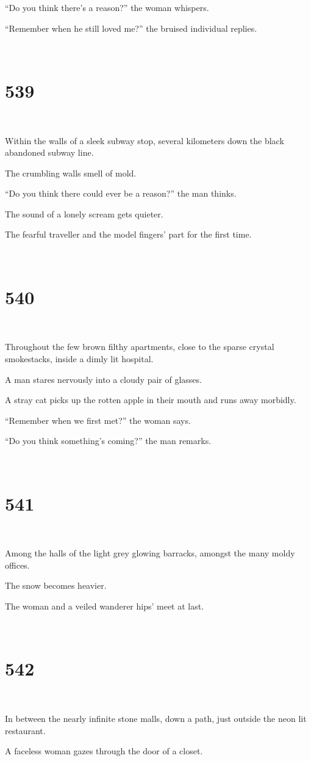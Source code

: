 \documentclass{report}
\begin{document}
``Do you think there's a reason?'' the woman whispers.

``Remember when he still loved me?'' the bruised individual replies.

~
\chapter*{539}
~

Within the walls of a sleek subway stop, several kilometers down the black abandoned subway line.

The crumbling walls smell of mold.

``Do you think there could ever be a reason?'' the man thinks.

The sound of a lonely scream gets quieter.

The fearful traveller and the model fingers' part for the first time.

~
\chapter*{540}
~

Throughout the few brown filthy apartments, close to the sparse crystal smokestacks, inside a dimly lit hospital.

A man stares nervously into a cloudy pair of glasses.

A stray cat picks up the rotten apple in their mouth and runs away morbidly.

``Remember when we first met?'' the woman says.

``Do you think something's coming?'' the man remarks.

~
\chapter*{541}
~

Among the halls of the light grey glowing barracks, amongst the many moldy offices.

The snow becomes heavier.

The woman and a veiled wanderer hips' meet at last.

~
\chapter*{542}
~

In between the nearly infinite stone malls, down a path, just outside the neon lit restaurant.

A faceless woman gazes through the door of a closet.
\end{document}
